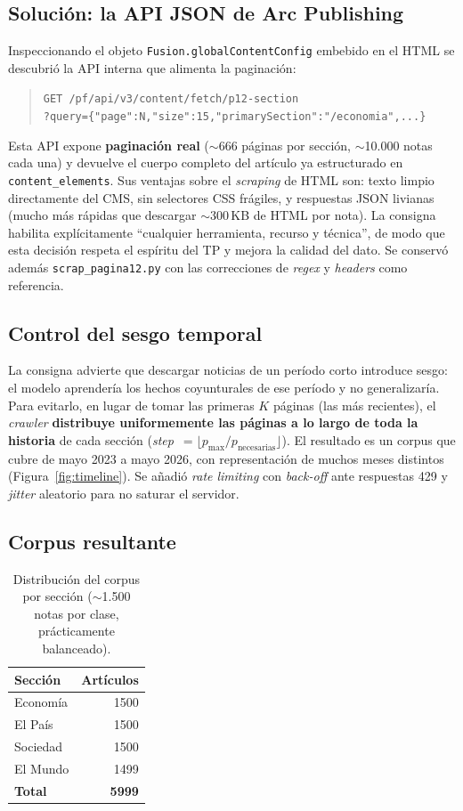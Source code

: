 \documentclass[11pt,a4paper]{article}
\newcommand{\Ntotal}{5999}
\newcommand{\Neco}{1500}
\newcommand{\Npais}{1500}
\newcommand{\Nsoc}{1500}
\newcommand{\Nmundo}{1499}
\newcommand{\dateStart}{mayo 2023}
\newcommand{\dateEnd}{mayo 2026}
\begin{document}
\subsection{Solución: la API JSON de Arc Publishing}
Inspeccionando el objeto \texttt{Fusion.globalContentConfig} embebido en el HTML
se descubrió la API interna que alimenta la paginación:
\begin{quote}\small
\texttt{GET /pf/api/v3/content/fetch/p12-section}\\
\texttt{?query=\{"page":N,"size":15,"primarySection":"/economia",...\}}
\end{quote}
Esta API expone \textbf{paginación real} ($\sim$666 páginas por sección, $\sim$10.000
notas cada una) y devuelve el cuerpo completo del artículo ya estructurado en
\texttt{content\_elements}. Sus ventajas sobre el \emph{scraping} de HTML son:
texto limpio directamente del CMS, sin selectores CSS frágiles, y respuestas JSON
livianas (mucho más rápidas que descargar $\sim$300\,KB de HTML por nota). La
consigna habilita explícitamente ``cualquier herramienta, recurso y técnica'', de
modo que esta decisión respeta el espíritu del TP y mejora la calidad del dato.
Se conservó además \texttt{scrap\_pagina12.py} con las correcciones de
\emph{regex} y \emph{headers} como referencia.

\subsection{Control del sesgo temporal}
La consigna advierte que descargar noticias de un período corto introduce sesgo:
el modelo aprendería los hechos coyunturales de ese período y no generalizaría. Para
evitarlo, en lugar de tomar las primeras $K$ páginas (las más recientes), el
\emph{crawler} \textbf{distribuye uniformemente las páginas a lo largo de toda la
historia} de cada sección (\emph{step}~$=\lfloor p_{\max}/p_{\text{necesarias}}
\rfloor$). El resultado es un corpus que cubre de \dateStart{} a \dateEnd{}, con
representación de muchos meses distintos (Figura~\ref{fig:timeline}). Se añadió
\emph{rate limiting} con \emph{back-off} ante respuestas 429 y \emph{jitter}
aleatorio para no saturar el servidor.

\subsection{Corpus resultante}
\begin{table}[H]
\centering
\begin{tabular}{lr}
\toprule
\textbf{Sección} & \textbf{Artículos} \\
\midrule
Economía & \Neco{} \\
El País  & \Npais{} \\
Sociedad & \Nsoc{} \\
El Mundo & \Nmundo{} \\
\midrule
\textbf{Total} & \textbf{\Ntotal{}} \\
\bottomrule
\end{tabular}
\caption{Distribución del corpus por sección ($\sim$1.500 notas por clase, prácticamente balanceado).}
\label{tab:corpus}
\end{table}
\end{document}
